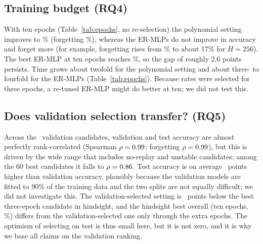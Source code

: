 \documentclass[11pt,a4paper]{article}
\newcommand{\RQ}[1]{\textbf{RQ#1}}
\begin{document}
\begin{table}[t]
\centering\scriptsize
\resizebox{\textwidth}{!}{}
\caption{Update rule $\times$ sampling policy: shared-rate reference versus the validation-selected per-degree vector (test seeds 3--9, 3 epochs; $t$ re-measured here for the selected vector).}
\label{tab:cells}
\end{table}

\subsection{Training budget (\RQ{4})}
With ten epochs (Table~\ref{tab:epochs}, no re-selection) the polynomial setting improves to \numPolyTenAcc\% (forgetting \numPolyTenForg\%), whereas the ER-MLPs do not improve in accuracy and forget more (for example, forgetting rises from \numErFloorTradeForg\% to about 17\% for $H{=}256$). The best ER-MLP at ten epochs reaches \numErTenBestAcc\%, so the gap of roughly 2.6 points persists. Time grows about twofold for the polynomial setting and about three- to fourfold for the ER-MLPs (Table~\ref{tab:epochs}). Because rates were selected for three epochs, a re-tuned ER-MLP might do better at ten; we did not test this.

\begin{table}[t]
\centering\scriptsize
\resizebox{\textwidth}{!}{}
\caption{Three versus ten epochs per experience, without re-selection (test seeds 3--9).}
\label{tab:epochs}
\end{table}

\subsection{Does validation selection transfer? (\RQ{5})}
Across the \numCandidatesValidation\ validation candidates, validation and test accuracy are almost perfectly rank-correlated (Spearman $\rho=0.99$; forgetting $\rho=0.99$), but this is driven by the wide range that includes no-replay and unstable candidates; among the 60 best candidates it falls to $\rho=0.86$. Test accuracy is on average \numMeanAccGap\ points higher than validation accuracy, plausibly because the validation models are fitted to 90\% of the training data and the two splits are not equally difficult; we did not investigate this. The validation-selected setting is \numRegret\ points below the best three-epoch candidate in hindsight, and the hindsight best overall (ten epochs, \numPolyTenAcc\%) differs from the validation-selected one only through the extra epochs. The optimism of selecting on test is thus small here, but it is not zero, and it is why we base all claims on the validation ranking.
\end{document}
